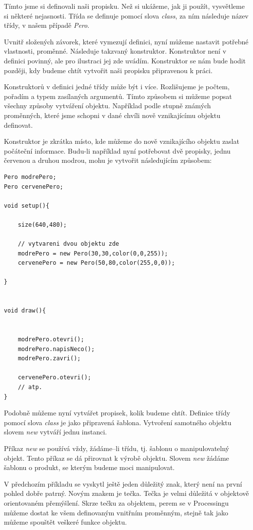 \documentclass[10pt]{book}
\newcommand{\vyraz}[1]{\textit{\gls{#1}}\index{#1}\label{#1}}
\begin{document}
Tímto jsme si definovali naši propisku. Než si ukážeme, jak ji použít, vysvětleme si některé nejasnosti. Třída se definuje pomocí slova \vyraz{class}, za ním následuje název třídy, v našem případě {\em Pero}.

Uvnitř složených závorek, které vymezují definici, nyní můžeme nastavit potřebné vlastnosti, proměnné. Následuje takzvaný konstruktor. Konstruktor není v definici povinný, ale pro ilustraci jej zde uvádím. Konstruktor se nám bude hodit později, kdy budeme chtít vytvořit naši propisku připravenou k práci.

Konstruktorů v definici jedné třídy může být i více. Rozlišujeme je počtem, pořadím a typem zasílaných argumentů. Tímto způsobem si můžeme popsat všechny způsoby vytváření objektu. Například podle stupně známých proměnných, které jsme schopni v dané chvíli nově vznikajícímu objektu definovat.

Konstruktor je zkrátka místo, kde můžeme do nově vznikajícího objektu zaslat počáteční informace. Budu-li například nyní potřebovat dvě propisky, jednu červenou a druhou modrou, mohu je vytvořit následujícím způsobem:




\begin{lstlisting}
Pero modrePero;
Pero cervenePero;

void setup(){

	size(640,480);
	
	// vytvareni dvou objektu zde
	modrePero = new Pero(30,30,color(0,0,255));
	cervenePero = new Pero(50,80,color(255,0,0));

}


void draw(){


	modrePero.otevri();
	modrePero.napisNeco();
	modrePero.zavri();
	
	cervenePero.otevri();
	// atp.
}
\end{lstlisting}

Podobně můžeme nyní vytvářet propisek, kolik budeme chtít. Definice třídy pomocí slova \vyraz{class} je jako připravená šablona. Vytvoření samotného objektu slovem \vyraz{new} vytváří jednu instanci.

Příkaz \vyraz{new} se používá vždy, žádáme--li třídu, tj. šablonu o manipulovatelný objekt. Tento příkaz se dá přirovnat k výrobě objektu. Slovem \vyraz{new} žádáme šablonu o produkt, se kterým budeme moci manipulovat.

V předchozím příkladu se vyskytl ještě jeden důležitý znak, který není na první pohled dobře patrný. Novým znakem je tečka. Tečka je velmi důležitá v objektově orientovaném přemýšlení. Skrze tečku za objektem, perem se v Processingu můžeme dostat ke všem definovaným vnitřním proměnným, stejně tak jako můžeme spouštět veškeré funkce objektu.
\end{document}

